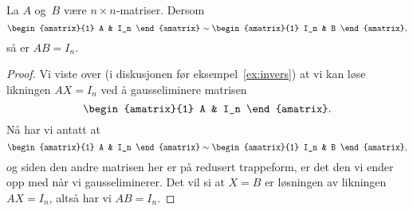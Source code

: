 
\begin{lem}
\label{lem:invers}
La $A$ og~$B$ være $n \times n$-matriser.  Dersom
\[
\begin{amatrix}{1} A & I_n \end{amatrix}
\roweq
\begin{amatrix}{1} I_n & B \end{amatrix},
\]
så er $AB = I_n$.
\end{lem}
\begin{proof}
Vi viste over (i diskusjonen før eksempel~\ref{ex:invers}) at vi kan
løse likningen $AX = I_n$ ved å gausseliminere matrisen
\[
\begin{amatrix}{1} A & I_n \end{amatrix}.
\]
Nå har vi antatt at
\[
\begin{amatrix}{1} A & I_n \end{amatrix}
\roweq
\begin{amatrix}{1} I_n & B \end{amatrix},
\]
og siden den andre matrisen her er på redusert trappeform, er det den
vi ender opp med når vi gausseliminerer.  Det vil si at $X = B$ er
løsningen av likningen $AX = I_n$, altså har vi $AB = I_n$.
\end{proof}


